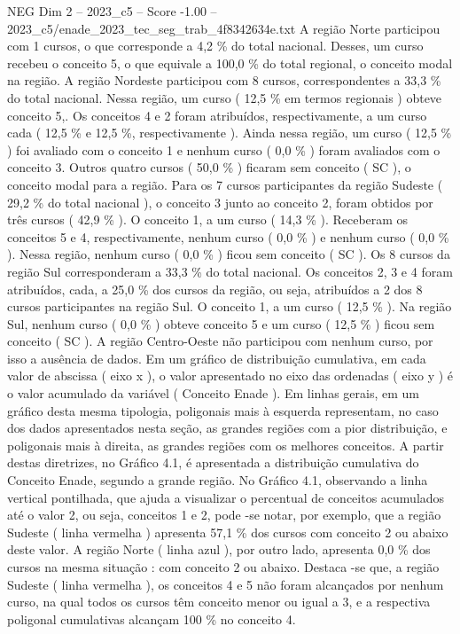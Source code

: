 \begin{textsample}{NEG Dim 2 – 2023\_c5 – Score -1.00 – 2023\_c5/enade\_2023\_tec\_seg\_trab\_4f8342634e.txt}
A região Norte participou com 1 cursos, o que corresponde a 4,2 \% do total nacional.
Desses, um curso recebeu o conceito 5, o que equivale a 100,0 \% do total regional, o conceito modal na região.
A região Nordeste participou com 8 cursos, correspondentes a 33,3 \% do total nacional.
Nessa região, um curso ( 12,5 \% em termos regionais ) obteve conceito 5,.
Os conceitos 4 e 2 foram atribuídos, respectivamente, a um curso cada ( 12,5 \% e 12,5 \%, respectivamente ).
Ainda nessa região, um curso ( 12,5 \% ) foi avaliado com o conceito 1 e nenhum curso ( 0,0 \% ) foram avaliados com o conceito 3.
Outros quatro cursos ( 50,0 \% ) ficaram sem conceito ( SC ), o conceito modal para a região.
Para os 7 cursos participantes da região Sudeste ( 29,2 \% do total nacional ), o conceito 3 junto ao conceito 2, foram obtidos por três cursos ( 42,9 \% ).
O conceito 1, a um curso ( 14,3 \% ).
Receberam os conceitos 5 e 4, respectivamente, nenhum curso ( 0,0 \% ) e nenhum curso ( 0,0 \% ).
Nessa região, nenhum curso ( 0,0 \% ) ficou sem conceito ( SC ).
Os 8 cursos da região Sul corresponderam a 33,3 \% do total nacional.
Os conceitos 2, 3 e 4 foram atribuídos, cada, a 25,0 \% dos cursos da região, ou seja, atribuídos a 2 dos 8 cursos participantes na região Sul.
O conceito 1, a um curso ( 12,5 \% ).
Na região Sul, nenhum curso ( 0,0 \% ) obteve conceito 5 e um curso ( 12,5 \% ) ficou sem conceito ( SC ).
A região Centro-Oeste não participou com nenhum curso, por isso a ausência de dados.
Em um gráfico de distribuição cumulativa, em cada valor de abscissa ( eixo x ), o valor apresentado no eixo das ordenadas ( eixo y ) é o valor acumulado da variável ( Conceito Enade ).
Em linhas gerais, em um gráfico desta mesma tipologia, poligonais mais à esquerda representam, no caso dos dados apresentados nesta seção, as grandes regiões com a pior distribuição, e poligonais mais à direita, as grandes regiões com os melhores conceitos.
A partir destas diretrizes, no Gráfico 4.1, é apresentada a distribuição cumulativa do Conceito Enade, segundo a grande região.
No Gráfico 4.1, observando a linha vertical pontilhada, que ajuda a visualizar o percentual de conceitos acumulados até o valor 2, ou seja, conceitos 1 e 2, pode -se notar, por exemplo, que a região Sudeste ( linha vermelha ) apresenta 57,1 \% dos cursos com conceito 2 ou abaixo deste valor.
A região Norte ( linha azul ), por outro lado, apresenta 0,0 \% dos cursos na mesma situação : com conceito 2 ou abaixo.
Destaca -se que, a região Sudeste ( linha vermelha ), os conceitos 4 e 5 não foram alcançados por nenhum curso, na qual todos os cursos têm conceito menor ou igual a 3, e a respectiva poligonal cumulativas alcançam 100 \% no conceito 4.

\end{textsample}
